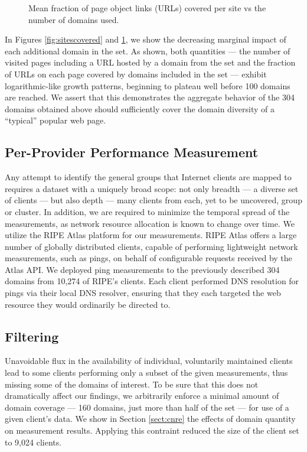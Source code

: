 \begin{figure}
    \caption{Mean fraction of page object links (URLs) covered per site vs the
    number of domains used.
    }
    \label{fig:linkscovered}
\end{figure}

In Figures \ref{fig:sitescovered} and \ref{fig:linkscovered}, we show the
decreasing marginal impact of each additional domain in the set. As shown, both
quantities --- the number of visited pages including a URL hosted by a domain
from the set and the fraction of URLs on each page covered by domains included
in the set --- exhibit logarithmic-like growth patterns, beginning to plateau
well before 100 domains are reached. We assert that this demonstrates the
aggregate behavior of the 304 domains obtained above should sufficiently cover
the domain diversity of a ``typical'' popular web page. 

\subsection{Per-Provider Performance Measurement}

Any attempt to identify the general groups that Internet clients are mapped to
requires a dataset with a uniquely broad scope: not only breadth --- a diverse
set of clients --- but also depth --- many clients from each, yet to be
uncovered, group or cluster. In addition, we are required to minimize the
temporal spread of the measurements, as network resource allocation is known to
change over time. We utilize the RIPE Atlas platform \cite{ripe-atlas} for our measurements.
RIPE Atlas offers a large number of globally distributed clients, capable of
performing lightweight network measurements, such as pings, on behalf of
configurable requests received by the Atlas API. We deployed ping measurements
to the previously described 304 domains from 10,274 of RIPE's clients. Each
client performed DNS resolution for pings via their local DNS resolver, ensuring
that they each targeted the web resource they would ordinarily be directed to.

\subsection{Filtering}

Unavoidable flux in the availability of individual, voluntarily maintained
clients lead to some clients performing only a subset of the given
measurements, thus missing some of the domains of interest. To be sure that this
does not dramatically affect our findings, we arbitrarily enforce a minimal amount
of domain coverage --- 160 domains, just more than half of the set --- for use
of a given client's data. We show in Section \ref{sect:cnre} the effects of domain quantity
on measurement results. Applying this contraint reduced the size of the client
set to 9,024 clients.  

